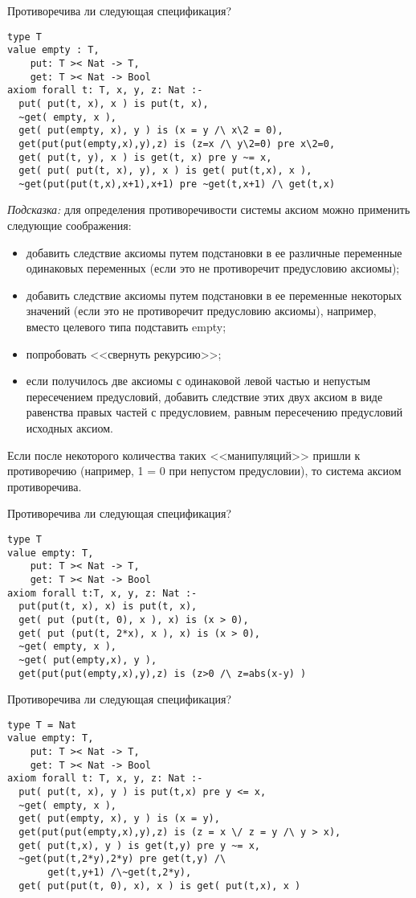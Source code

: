 \z Противоречива ли следующая спецификация?
\begin{lstlisting}
type T
value empty : T,
    put: T >< Nat -> T,
    get: T >< Nat -> Bool
axiom forall t: T, x, y, z: Nat :-
  put( put(t, x), x ) is put(t, x),
  ~get( empty, x ),
  get( put(empty, x), y ) is (x = y /\ x\2 = 0),
  get(put(put(empty,x),y),z) is (z=x /\ y\2=0) pre x\2=0,
  get( put(t, y), x ) is get(t, x) pre y ~= x,
  get( put( put(t, x), y), x ) is get( put(t,x), x ),
  ~get(put(put(t,x),x+1),x+1) pre ~get(t,x+1) /\ get(t,x)
\end{lstlisting}

\textit{Подсказка:} для определения противоречивости системы аксиом можно применить следующие соображения:
\begin{itemize}
  \item добавить следствие аксиомы путем подстановки в ее различные переменные одинаковых переменных (если это не противоречит предусловию аксиомы);
  \item добавить следствие аксиомы путем подстановки в ее переменные некоторых значений (если это не противоречит предусловию аксиомы), например, вместо целевого типа подставить empty;
  \item попробовать <<свернуть рекурсию>>;
  \item если получилось две аксиомы с одинаковой левой частью и непустым пересечением предусловий, добавить следствие этих двух аксиом в виде равенства правых частей с предусловием, равным пересечению предусловий исходных аксиом.
\end{itemize}

Если после некоторого количества таких <<манипуляций>> пришли к противоречию (например, 1 = 0 при непустом предусловии), то система аксиом противоречива.

\z Противоречива ли следующая спецификация?
\begin{lstlisting}
type T
value empty: T,
    put: T >< Nat -> T,
    get: T >< Nat -> Bool
axiom forall t:T, x, y, z: Nat :-
  put(put(t, x), x) is put(t, x),
  get( put (put(t, 0), x ), x) is (x > 0),
  get( put (put(t, 2*x), x ), x) is (x > 0),
  ~get( empty, x ),
  ~get( put(empty,x), y ),
  get(put(put(empty,x),y),z) is (z>0 /\ z=abs(x-y) )
\end{lstlisting}

\z Противоречива ли следующая спецификация?
\begin{lstlisting}
type T = Nat
value empty: T,
    put: T >< Nat -> T,
    get: T >< Nat -> Bool
axiom forall t: T, x, y, z: Nat :-
  put( put(t, x), y ) is put(t,x) pre y <= x,
  ~get( empty, x ),
  get( put(empty, x), y ) is (x = y),
  get(put(put(empty,x),y),z) is (z = x \/ z = y /\ y > x),
  get( put(t,x), y ) is get(t,y) pre y ~= x,
  ~get(put(t,2*y),2*y) pre get(t,y) /\
       get(t,y+1) /\~get(t,2*y),
  get( put(put(t, 0), x), x ) is get( put(t,x), x )
\end{lstlisting}

